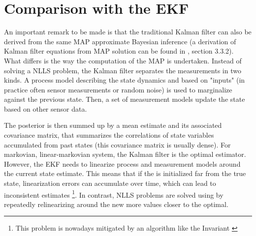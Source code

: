 \section{Comparison with the EKF}

An important remark to be made is that the traditional Kalman filter can also be derived from the same MAP approximate Bayesian inference (a derivation 
of Kalman filter equations from MAP solution can be found in \cite{barfoot2017state}, section 3.3.2). What differs is the way the computation of the 
MAP is undertaken. Instead of solving a NLLS problem, the Kalman filter separates the measurements in two kinds. 
A process model describing the state dynamics and based on "inputs" (in practice often sensor measurements or random noise) is used to marginalize 
against the previous state. Then, a set of measurement models update the state based on other sensor data.

The posterior is then summed up by a mean estimate and its associated covariance matrix, that summarizes the correlations of state variables
accumulated from past states (this covariance matrix is usually dense). For markovian, linear-markovian system, the Kalman filter is the optimal
estimator. However, the EKF needs to linearize process and measurement models around the current state estimate. This means that if the is initialized
far from the true state, linearization errors can accumulate over time, which can lead to inconsistent estimates \footnote{This problem is nowadays
mitigated by an algorithm like the Invariant \KalmanF \cite{barrau2018invariant}}. In contrast, NLLS problems are
solved using by repeatedly relinearizing around the new more values closer to the optimal.

